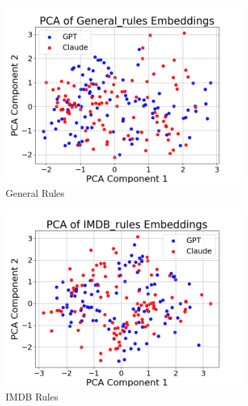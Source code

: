 \documentclass{article}
\begin{document}
\begin{figure}[ht]
    \centering
    \begin{subfigure}[b]{0.32\textwidth}
        \centering
        \includegraphics[width=\textwidth]{figures/PCA_plots/General_rules_embeddings.png}
        \caption{General Rules}
        \label{fig:general_rules}
    \end{subfigure}
    \hfill
    \begin{subfigure}[b]{0.32\textwidth}
        \centering
        \includegraphics[width=\textwidth]{figures/PCA_plots/IMDB_rules_embeddings.png}
        \caption{IMDB Rules}
        \label{fig:imdb_rules}
    \end{subfigure}
    \hfill
    \begin{subfigure}[b]{0.32\textwidth}

\end{subfigure}
\end{figure}
\end{document}
